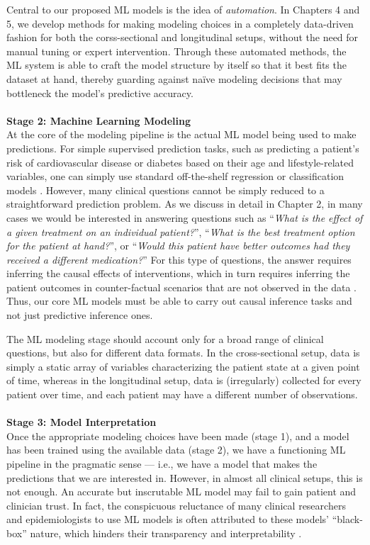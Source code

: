 \documentclass [PhD] {uclathes}
\begin{document}
Central to our proposed ML models is the idea of \textit{automation}. In Chapters 4 and 5, we develop methods for making modeling choices in a completely data-driven fashion for both the corss-sectional and longitudinal setups, without the need for manual tuning or expert intervention. Through these automated methods, the ML system is able to craft the model structure by itself so that it best fits the dataset at hand, thereby guarding against na\"ive modeling decisions that may bottleneck the model's predictive accuracy.   \\  
\\ 
\textbf{Stage 2: Machine Learning Modeling}\\
At the core of the modeling pipeline is the actual ML model being used to make predictions. For simple supervised prediction tasks, such as predicting a patient's risk of cardiovascular disease or diabetes based on their age and lifestyle-related variables, one can simply use standard off-the-shelf regression or classification models \cite{weng2017can}. However, many clinical questions cannot be simply reduced to a straightforward prediction problem. As we discuss in detail in Chapter 2, in many cases we would be interested in answering questions such as ``\textit{What is the effect of a given treatment on an individual patient?}'', ``\textit{What is the best treatment option for the patient at hand?}'', or ``\textit{Would this patient have better outcomes had they received a
different medication?}'' For this type of questions, the answer requires inferring the causal effects of interventions, which in turn requires inferring the patient outcomes in counter-factual scenarios that are not observed in the data \cite{morgan2015counterfactuals}. Thus, our core ML models must be able to carry out causal inference tasks and not just predictive inference ones.    

The ML modeling stage should account only for a broad range of clinical questions, but also for different data formats. In the cross-sectional setup, data is simply a static array of variables characterizing the patient state at a given point of time, whereas in the longitudinal setup, data is (irregularly) collected for every patient over time, and each patient may have a different number of observations.  \\ 
\\
\textbf{Stage 3: Model Interpretation}\\
Once the appropriate modeling choices have been made (stage 1), and a model has been trained using the available data (stage 2), we have a functioning ML pipeline in the pragmatic sense --- i.e., we have a model that makes the predictions that we are interested in. However, in almost all clinical setups, this is not enough. An accurate but inscrutable ML model may fail to gain patient and clinician trust. In fact, the conspicuous reluctance of many clinical researchers and epidemiologists to use ML models is often attributed to these models' ``black-box'' nature, which hinders their transparency and interpretability \cite{guidotti2019survey}. 
\end{document}
